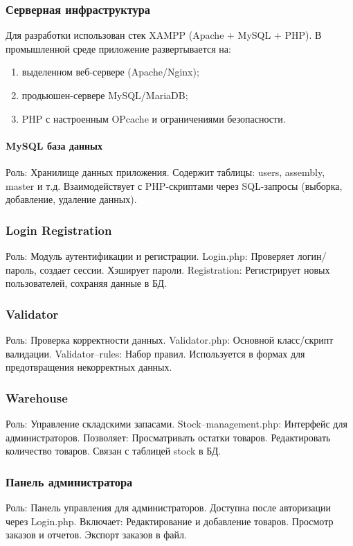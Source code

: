 \subsubsection{Серверная инфраструктура}
Для разработки использован стек XAMPP (Apache + MySQL + PHP). В промышленной среде приложение развертывается на:
\begin{enumerate}
	\item выделенном веб-сервере (Apache/Nginx);
	\item продьюшен-сервере MySQL/MariaDB;
	\item PHP с настроенным OPcache и ограничениями безопасности.
\end{enumerate}

\paragraph{MySQL база данных} 
Роль: Хранилище данных приложения.
Содержит таблицы: users, assembly, master и т.д.
Взаимодействует с PHP-скриптами через SQL-запросы (выборка, добавление, удаление данных).

\subsubsection{Login Registration}
Роль: Модуль аутентификации и регистрации.
Login.php: Проверяет логин/пароль, создает сессии.
Хэширует пароли.
Registration: Регистрирует новых пользователей, сохраняя данные в БД.

\subsubsection{Validator}
Роль: Проверка корректности данных.
Validator.php: Основной класс/скрипт валидации.
Validator--rules: Набор правил.
Используется в формах для предотвращения некорректных данных.

\subsubsection{Warehouse}
Роль: Управление складскими запасами.
Stock--management.php: Интерфейс для администраторов. Позволяет:
Просматривать остатки товаров.
Редактировать количество товаров.
Связан с таблицей stock в БД.

\subsubsection{Панель администратора}
Роль: Панель управления для администраторов.
Доступна после авторизации через Login.php.
Включает:
Редактирование и добавление товаров.
Просмотр заказов и отчетов.
Экспорт заказов в файл.

